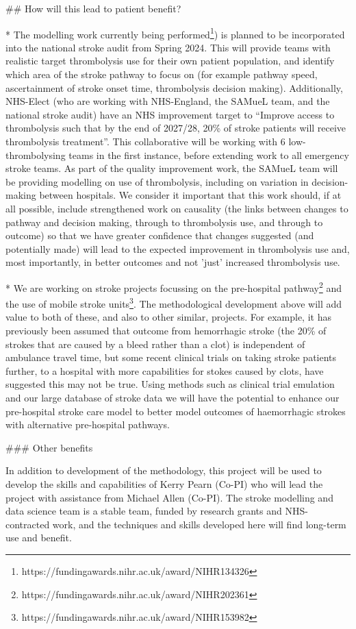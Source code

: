 \begin{markdown}
## How will this lead to patient benefit?

* The modelling work currently being performed\footnote{https://fundingawards.nihr.ac.uk/award/NIHR134326}) is planned to be incorporated into the national stroke audit from Spring 2024. This will provide teams with realistic target thrombolysis use for their own patient population, and identify which area of the stroke pathway to focus on (for example pathway speed, ascertainment of stroke onset time, thrombolysis decision making). Additionally, NHS-Elect (who are working with NHS-England, the SAMueL team, and the national stroke audit) have an NHS improvement target to “Improve access to thrombolysis such that by the end of 2027/28, 20\% of stroke patients will receive thrombolysis treatment”. This collaborative will be working with 6 low-thrombolysing teams in the first instance, before extending work to all emergency stroke teams. As part of the quality improvement work, the SAMueL team will be providing modelling on use of thrombolysis, including on variation in decision-making between hospitals. We consider it important that this work should, if at all possible, include strengthened work on causality (the links between changes to pathway and decision making, through to thrombolysis use, and through to outcome) so that we have greater confidence that changes suggested (and potentially made) will lead to the expected improvement in thrombolysis use and, most importantly, in better outcomes and not 'just' increased thrombolysis use.

* We are working on stroke projects focussing on the pre-hospital pathway\footnote{https://fundingawards.nihr.ac.uk/award/NIHR202361} and the use of mobile stroke units\footnote{https://fundingawards.nihr.ac.uk/award/NIHR153982}. The methodological development above will add value to both of these, and also to other similar, projects. For example, it has previously been assumed that outcome from hemorrhagic stroke (the 20\% of strokes that are caused by a bleed rather than a clot) is independent of ambulance travel time, but some recent clinical trials on taking stroke patients further, to a hospital with more capabilities for stokes caused by clots, have suggested this may not be true. Using methods such as clinical trial emulation and our large database of stroke data we will have the potential to enhance our pre-hospital stroke care model to better model outcomes of haemorrhagic strokes with alternative pre-hospital pathways.

### Other benefits

In addition to development of the methodology, this project will be used to develop the skills and capabilities of Kerry Pearn (Co-PI) who will lead the project with assistance from Michael Allen (Co-PI). The stroke modelling and data science team is a stable team, funded by research grants and NHS-contracted work, and the techniques and skills developed here will find long-term use and benefit.

\end{markdown}
